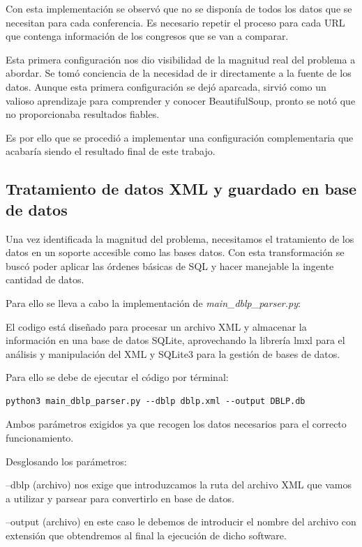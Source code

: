 \documentclass[a4paper, 12pt]{book}
\begin{document}
Con esta implementación se observó que no se disponía de todos los datos que se necesitan para cada conferencia. Es necesario repetir el proceso para cada URL que contenga información de los congresos que se van a comparar.

Esta primera configuración nos dio visibilidad de la magnitud real del problema a abordar. Se tomó conciencia de la necesidad de ir directamente a la fuente de los datos. Aunque esta primera configuración se dejó aparcada, sirvió como un valioso aprendizaje para comprender y conocer BeautifulSoup, pronto se notó que no proporcionaba resultados fiables.

Es por ello que se procedió a implementar una configuración complementaria que acabaría siendo el resultado final de este trabajo.

\subsection{Tratamiento de datos XML y guardado en base de datos}

Una vez identificada la magnitud del problema, necesitamos el tratamiento de los datos en un soporte accesible como las bases datos. Con esta transformación se buscó poder aplicar las órdenes básicas de SQL y hacer manejable la ingente cantidad de datos.

Para ello se lleva a cabo la implementación de \textit{main\_dblp\_parser.py}:

El codigo está diseñado para procesar un archivo XML y almacenar la información en una base de datos SQLite, aprovechando la librería lmxl para el análisis y manipulación del XML y SQLite3 para la gestión de bases de datos.

Para ello se debe de ejecutar el código por términal:

\begin{verbatim}
python3 main_dblp_parser.py --dblp dblp.xml --output DBLP.db 
\end{verbatim}

Ambos parámetros exigidos ya que recogen los datos necesarios para el correcto funcionamiento.

Desglosando los parámetros:

--dblp (archivo) nos exige que introduzcamos la ruta del archivo XML que vamos a utilizar y parsear para convertirlo en base de datos.

--output (archivo) en este caso le debemos de introducir el nombre del archivo con extensión que obtendremos al final la ejecución de dicho software. 
\end{document}
